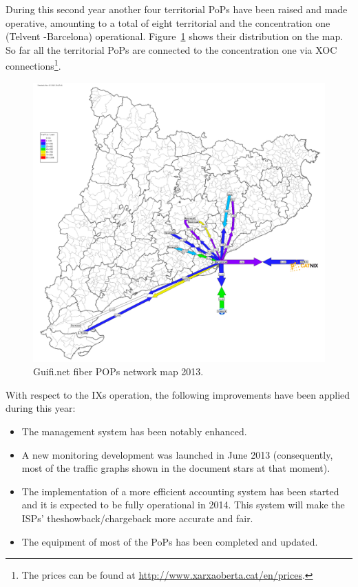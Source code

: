 During this second year another four territorial PoPs have been raised and made operative, amounting to a total of eight territorial and the concentration one (Telvent -Barcelona) operational. Figure~\ref{fig:pop_weathermap} shows their distribution on the map. So far all the territorial PoPs are connected to the concentration one via XOC connections\footnote{The prices can be found at \url{http://www.xarxaoberta.cat/en/prices}.}.

\begin{figure}[H]
  \centering
  \includegraphics[width=0.95\linewidth]{sect3/figures/weathermap.png} 
  \caption[Guifi.net fiber POPs network map 2013]{Guifi.net fiber POPs network map 2013.}
  \label{fig:pop_weathermap}
\end{figure}

With respect to the IXs operation, the following improvements have been applied during this year:
\begin{itemize}
  \item The management system has been notably enhanced.
  \item A new monitoring development was launched in June 2013 (consequently, most of the traffic graphs shown in the document stars at that moment).
  \item The implementation of a more efficient accounting system has been started and it is expected to be fully operational in 2014. This system will make the ISPs' theshowback/chargeback more accurate and fair.
  \item The equipment of most of the PoPs has been completed and updated.
\end{itemize}

